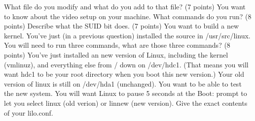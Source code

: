 What file do you modify and what do you add to that file?
\vskip 1.5in
\ques
(7 points)
You want to know about the video setup on your machine.
What commands do you run?
\vskip 1.5in
\ques
(8 points)
Describe what the {\ltt{}SUID} bit does.
\vskip 2.0in
\ques
(7 points)
You want to build a new kernel. You've just (in a previous question)
installed the source in {\ltt{}/usr/src/linux}.
You will need to run three commands, what are those three commands?
\vfill\eject
\ques
(8 points)
You've just installed an new version of Linux, including the kernel
({\ltt{}vmlinuz}), and everything else from {\ltt{}/} down on 
{\ltt{}/dev/hdc1}. (That means you will want {\ltt{}hdc1} to be your root 
directory when you boot this new version.)
Your old version of linux is still on {\ltt{}/dev/hda1} (unchanged).
You want to be able to test the new system. 
You will want Linux to pause 5 seconds at the {\ltt{}Boot:} prompt
to let you select {\ltt{}linux} (old verion) or {\ltt{}linnew} (new version).
Give the exact contents of your {\ltt{}lilo.conf}.

\bye
